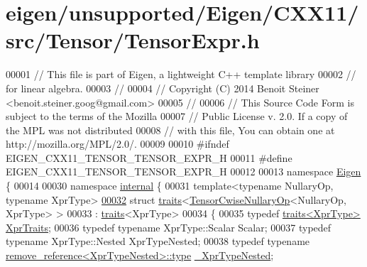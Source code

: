 \hypertarget{eigen_2unsupported_2_eigen_2_c_x_x11_2src_2_tensor_2_tensor_expr_8h_source}{}\section{eigen/unsupported/\+Eigen/\+C\+X\+X11/src/\+Tensor/\+Tensor\+Expr.h}
\label{eigen_2unsupported_2_eigen_2_c_x_x11_2src_2_tensor_2_tensor_expr_8h_source}

\begin{DoxyCode}
00001 \textcolor{comment}{// This file is part of Eigen, a lightweight C++ template library}
00002 \textcolor{comment}{// for linear algebra.}
00003 \textcolor{comment}{//}
00004 \textcolor{comment}{// Copyright (C) 2014 Benoit Steiner <benoit.steiner.goog@gmail.com>}
00005 \textcolor{comment}{//}
00006 \textcolor{comment}{// This Source Code Form is subject to the terms of the Mozilla}
00007 \textcolor{comment}{// Public License v. 2.0. If a copy of the MPL was not distributed}
00008 \textcolor{comment}{// with this file, You can obtain one at http://mozilla.org/MPL/2.0/.}
00009 
00010 \textcolor{preprocessor}{#ifndef EIGEN\_CXX11\_TENSOR\_TENSOR\_EXPR\_H}
00011 \textcolor{preprocessor}{#define EIGEN\_CXX11\_TENSOR\_TENSOR\_EXPR\_H}
00012 
00013 \textcolor{keyword}{namespace }\hyperlink{namespace_eigen}{Eigen} \{
00014 
00030 \textcolor{keyword}{namespace }\hyperlink{namespaceinternal}{internal} \{
00031 \textcolor{keyword}{template}<\textcolor{keyword}{typename} NullaryOp, \textcolor{keyword}{typename} XprType>
\hyperlink{struct_eigen_1_1internal_1_1traits_3_01_tensor_cwise_nullary_op_3_01_nullary_op_00_01_xpr_type_01_4_01_4}{00032} \textcolor{keyword}{struct }\hyperlink{struct_eigen_1_1internal_1_1traits}{traits}<\hyperlink{class_eigen_1_1_tensor_cwise_nullary_op}{TensorCwiseNullaryOp}<NullaryOp, XprType> >
00033     : \hyperlink{struct_eigen_1_1internal_1_1traits}{traits}<XprType>
00034 \{
00035   \textcolor{keyword}{typedef} \hyperlink{struct_eigen_1_1internal_1_1traits}{traits<XprType>} \hyperlink{struct_eigen_1_1internal_1_1traits}{XprTraits};
00036   \textcolor{keyword}{typedef} \textcolor{keyword}{typename} XprType::Scalar Scalar;
00037   \textcolor{keyword}{typedef} \textcolor{keyword}{typename} XprType::Nested XprTypeNested;
00038   \textcolor{keyword}{typedef} \textcolor{keyword}{typename} \hyperlink{group___sparse_core___module}{remove\_reference<XprTypeNested>::type} 
      \hyperlink{group___sparse_core___module}{\_XprTypeNested};

\end{DoxyCode}
